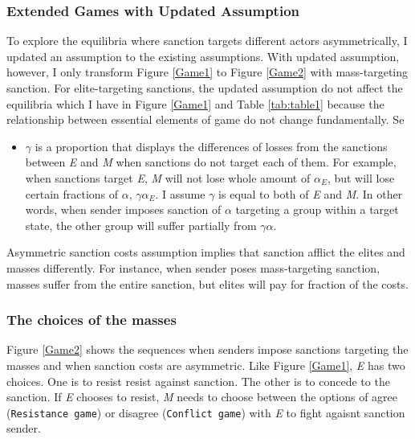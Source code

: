 \documentclass[11pt]{article}
\begin{document}
\subsubsection*{Extended Games with Updated Assumption}

To explore the equilibria where sanction targets different actors asymmetrically, I updated an assumption to the existing assumptions. With updated assumption, however, I only transform Figure \ref{Game1} to Figure \ref{Game2} with mass-targeting sanction. For elite-targeting sanctions, the updated assumption do not affect the equilibria which I have in Figure \ref{Game1} and Table \ref{tab:table1} because the relationship between essential elements of game do not change fundamentally. Se 

\begin{itemize}
	\item $\gamma$ is a proportion that displays the differences of losses from the sanctions between \textit{E} and \textit{M} when sanctions do not target each of them. For example, when sanctions target \textit{E}, \textit{M} will not lose whole amount of $\alpha_{E}$, but will lose certain fractions of $\alpha$, $\gamma\alpha_{E}$. I assume $\gamma$ is equal to both of \textit{E} and \textit{M}. In other words, when sender imposes sanction of $\alpha$ targeting a group within a target state, the other group will suffer partially from $\gamma\alpha$.
\end{itemize}

Asymmetric sanction costs assumption implies that sanction afflict the elites and masses differently. For instance, when sender poses mass-targeting sanction, masses suffer from the entire sanction, but elites will pay for fraction of the costs. 

\begin{center}
	
\end{center}

\subsubsection*{The choices of the masses}

Figure \ref{Game2} shows the sequences when senders impose sanctions targeting the masses and when sanction costs are asymmetric. Like Figure \ref{Game1}, \textit{E} has two choices. One is to resist resist against sanction. The other is to concede to the sanction. If \textit{E} chooses to resist, \textit{M} needs to choose between the options of agree (\texttt{Resistance game}) or disagree (\texttt{Conflict game}) with \textit{E} to fight agaisnt sanction sender. 
	
\end{document}

